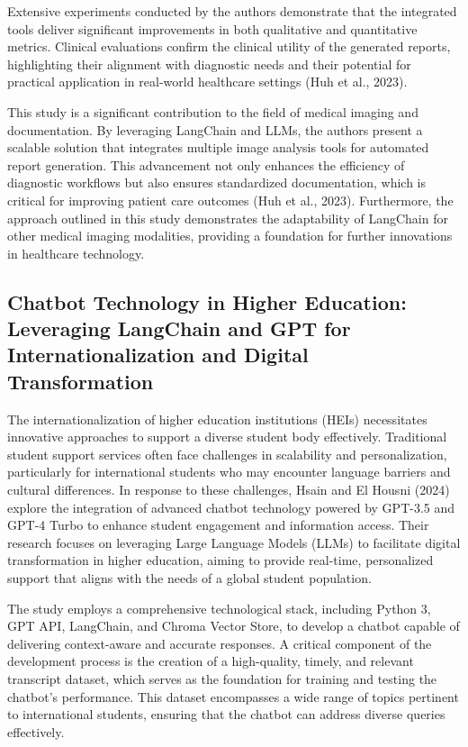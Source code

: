 Extensive experiments conducted by the authors demonstrate that the integrated tools deliver significant improvements in both qualitative and quantitative metrics. Clinical evaluations confirm the clinical utility of the generated reports, highlighting their alignment with diagnostic needs and their potential for practical application in real-world healthcare settings (Huh et al., 2023).

This study is a significant contribution to the field of medical imaging and documentation. By leveraging LangChain and LLMs, the authors present a scalable solution that integrates multiple image analysis tools for automated report generation. This advancement not only enhances the efficiency of diagnostic workflows but also ensures standardized documentation, which is critical for improving patient care outcomes (Huh et al., 2023). Furthermore, the approach outlined in this study demonstrates the adaptability of LangChain for other medical imaging modalities, providing a foundation for further innovations in healthcare technology.


\subsection{Chatbot Technology in Higher Education: Leveraging LangChain and GPT for Internationalization and Digital Transformation}

\noindent The internationalization of higher education institutions (HEIs) necessitates innovative approaches to support a diverse student body effectively. Traditional student support services often face challenges in scalability and personalization, particularly for international students who may encounter language barriers and cultural differences. In response to these challenges, Hsain and El Housni (2024) explore the integration of advanced chatbot technology powered by GPT-3.5 and GPT-4 Turbo to enhance student engagement and information access. Their research focuses on leveraging Large Language Models (LLMs) to facilitate digital transformation in higher education, aiming to provide real-time, personalized support that aligns with the needs of a global student population.

The study employs a comprehensive technological stack, including Python 3, GPT API, LangChain, and Chroma Vector Store, to develop a chatbot capable of delivering context-aware and accurate responses. A critical component of the development process is the creation of a high-quality, timely, and relevant transcript dataset, which serves as the foundation for training and testing the chatbot's performance. This dataset encompasses a wide range of topics pertinent to international students, ensuring that the chatbot can address diverse queries effectively.

